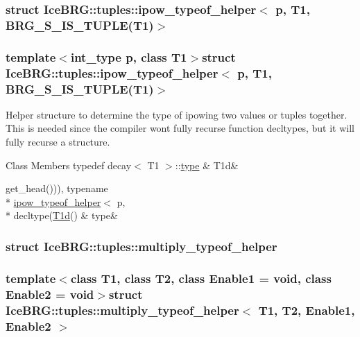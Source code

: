 \subsubsection{struct Ice\+B\+R\+G\+:\+:tuples\+:\+:ipow\+\_\+typeof\+\_\+helper$<$ p, T1, B\+R\+G\+\_\+\+S\+\_\+\+I\+S\+\_\+\+T\+U\+P\+L\+E(T1)$>$}
\subsubsection*{template$<$int\+\_\+type p, class T1$>$struct Ice\+B\+R\+G\+::tuples\+::ipow\+\_\+typeof\+\_\+helper$<$ p, T1, B\+R\+G\+\_\+\+S\+\_\+\+I\+S\+\_\+\+T\+U\+P\+L\+E(\+T1)$>$}

Helper structure to determine the type of ipowing two values or tuples together. This is needed since the compiler won\textquotesingle{}t fully recurse function decltypes, but it will fully recurse a structure. \begin{DoxyFields}{Class Members}
\hypertarget{namespaceIceBRG_1_1tuples_a1368a0d7b4c47bd64f1f57c45a764085}{}typedef decay$<$ T1 $>$\+::\hyperlink{namespaceIceBRG_1_1tuples_aed1bfdd2be2297b3023a4480680a5ec0}{type}\label{namespaceIceBRG_1_1tuples_a1368a0d7b4c47bd64f1f57c45a764085}
&
T1d&
\\
\hline

\hypertarget{namespaceIceBRG_1_1tuples_aed1bfdd2be2297b3023a4480680a5ec0}{}get\+\_\+head())), typename \\*
\hyperlink{namespaceIceBRG_1_1tuples_structIceBRG_1_1tuples_1_1ipow__typeof__helper}{ipow\+\_\+typeof\+\_\+helper}$<$ p, \\*
decltype(\hyperlink{namespaceIceBRG_1_1tuples_a1368a0d7b4c47bd64f1f57c45a764085}{T1d}()\label{namespaceIceBRG_1_1tuples_aed1bfdd2be2297b3023a4480680a5ec0}
&
type&
\\
\hline

\end{DoxyFields}
\label{structIceBRG_1_1tuples_1_1multiply__typeof__helper}
\hypertarget{namespaceIceBRG_1_1tuples_structIceBRG_1_1tuples_1_1multiply__typeof__helper}{}
\subsubsection{struct Ice\+B\+R\+G\+:\+:tuples\+:\+:multiply\+\_\+typeof\+\_\+helper}
\subsubsection*{template$<$class T1, class T2, class Enable1 = void, class Enable2 = void$>$struct Ice\+B\+R\+G\+::tuples\+::multiply\+\_\+typeof\+\_\+helper$<$ T1, T2, Enable1, Enable2 $>$}

